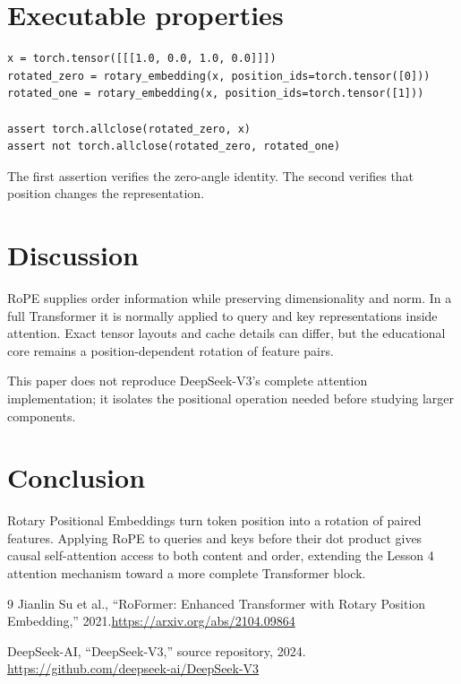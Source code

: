 \documentclass[11pt]{article}
\begin{document}
\section{Executable properties}
\begin{lstlisting}
x = torch.tensor([[[1.0, 0.0, 1.0, 0.0]]])
rotated_zero = rotary_embedding(x, position_ids=torch.tensor([0]))
rotated_one = rotary_embedding(x, position_ids=torch.tensor([1]))

assert torch.allclose(rotated_zero, x)
assert not torch.allclose(rotated_zero, rotated_one)
\end{lstlisting}

The first assertion verifies the zero-angle identity. The second verifies that
position changes the representation.

\section{Discussion}
RoPE supplies order information while preserving dimensionality and norm. In
a full Transformer it is normally applied to query and key representations
inside attention. Exact tensor layouts and cache details can differ, but the
educational core remains a position-dependent rotation of feature pairs.

This paper does not reproduce DeepSeek-V3's complete attention implementation;
it isolates the positional operation needed before studying larger components.

\section{Conclusion}
Rotary Positional Embeddings turn token position into a rotation of paired
features. Applying RoPE to queries and keys before their dot product gives
causal self-attention access to both content and order, extending the Lesson 4
attention mechanism toward a more complete Transformer block.

\begin{thebibliography}{9}
Jianlin Su et al., ``RoFormer: Enhanced Transformer with Rotary Position
Embedding,'' 2021.\url{https://arxiv.org/abs/2104.09864}

DeepSeek-AI, ``DeepSeek-V3,'' source repository, 2024.
\url{https://github.com/deepseek-ai/DeepSeek-V3}
\end{thebibliography}
\end{document}
